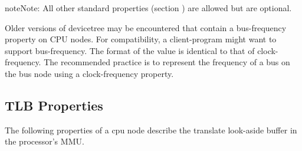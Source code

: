 \documentclass[a4paper,10pt,oneside]{sphinxmanual}
\begin{document}
\begin{notice}{note}{Note:}
All other standard properties (section
{\hyperref[devicetree\string-basics:sect\string-standard\string-properties]{}}) are allowed but are optional.
\end{notice}

Older versions of devicetree may be encountered that contain a
bus-frequency property on CPU nodes. For compatibility, a client-program
might want to support bus-frequency. The format of the value is
identical to that of clock-frequency. The recommended practice is to
represent the frequency of a bus on the bus node using a clock-frequency
property.


\subsection{TLB Properties}
\label{devicenodes:tlb-properties}
The following properties of a cpu node describe the translate look-aside
buffer in the processor’s MMU.
\end{document}
